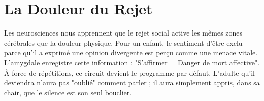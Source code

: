 \section{La Douleur du Rejet}
Les neurosciences nous apprennent que le rejet social active les mêmes zones cérébrales que la douleur physique. Pour un enfant, le sentiment d'être exclu parce qu'il a exprimé une opinion divergente est perçu comme une menace vitale. L'amygdale enregistre cette information : "S'affirmer = Danger de mort affective". À force de répétitions, ce circuit devient le programme par défaut. L'adulte qu'il deviendra n'aura pas "oublié" comment parler ; il aura simplement appris, dans sa chair, que le silence est son seul bouclier.
